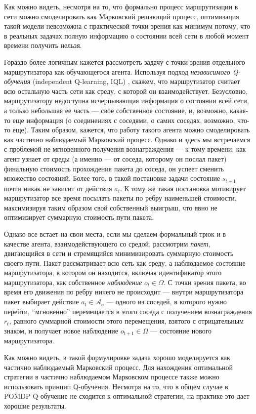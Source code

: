 \documentclass[specification, annotation]{itmo-student-thesis}
\begin{document}
Как можно видеть, несмотря на то, что формально процесс маршрутизации в сети
можно смоделировать как Марковский решающий процесс, оптимизация такой модели
невозможна с практической точки зрения как минимум потому, что в реальных
задачах полную информацию о состоянии всей сети в любой момент времени получить
нельзя.

Гораздо более логичным кажется рассмотреть задачу с точки зрения отдельного
маршрутизатора как обучающегося агента. Используя подход \textit{независимого
  Q-обучения} (independent Q-learning, IQL) \cite{tan1993multi}, скажем, что
маршрутизатор считает всю остальную часть сети как среду, с которой он
взаимодействует. Безусловно, маршрутизатору недоступна исчерпывающая информация
о состоянии всей сети, а только небольшая ее часть --- свое собственное
состояние, и, возможно, какая-то еще информация (о соединениях с соседями, о
самих соседях, возможно, что-то еще). Таким образом, кажется, что работу такого
агента можно смоделировать как частично наблюдаемый Марковский процесс. Однако и
здесь мы встречаемся с проблемой не мгновенного получения вознаграждения --- к
тому времени, как агент узнает от среды (а именно --- от соседа, которому он
послал пакет) финальную стоимость прохождения пакета до соседа, он успеет
сменить множество состояний. Более того, в такой постановке задачи состояние
$s_{t+1}$ почти никак не зависит от действия $a_t$. К тому же такая постановка
мотивирует маршрутизатор все время посылать пакеты по ребру наименьшей
стоимости, максимизируя таким образом свой собственный выигрыш, что явно не
оптимизирует суммарную стоимость пути пакета.

Однако все встает на свои места, если мы сделаем формальный трюк и в качестве
агента, взаимодействующего со средой, рассмотрим \textit{пакет}, двигающийся в
сети и стремящийся минимизировать суммарную стоимость своего пути. Пакет
рассматривает всю сеть как среду, а наблюдаемое состояние маршрутизатора, в
котором он находится, включая идентификатор этого маршрутизатора, как
собственное \textit{наблюдение}  $o_t \in \Omega$. С точки зрения пакета, во время
его движения по ребру ничего не происходит --- внутри маршрутизатора пакет
выбирает действие $a_t \in \mathcal{A}_o$ --- одного из соседей, в которого нужно
перейти, \enquote{мгновенно} перемещается в этого соседа с получением вознаграждения $r_t$,
равного суммарной стоимости этого перемещения, взятого с отрицательным знаком, и
получает новое наблюдение $o_{t+1} \in \Omega$ --- состояние нового маршрутизатора.

Как можно видеть, в такой формулировке задача хорошо моделируется как частично
наблюдаемый Марковский процесс. Для нахождения оптимальной стратегии в частично
наблюдаемом Марковском процессе также можно использовать принцип Q-обучения.
Несмотря на то, что в общем случае в POMDP Q-обучение не сходится к оптимальной
стратегии, на практике это дает хорошие результаты.
\end{document}
